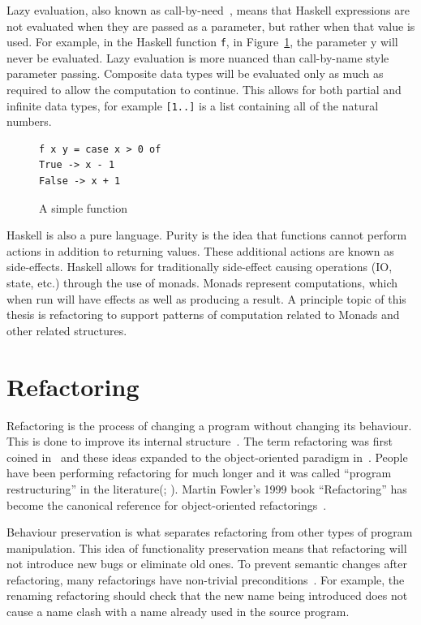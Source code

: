 Lazy evaluation, also known as call-by-need~\citep{wadsworth}, means that Haskell expressions are not evaluated when they are passed as a parameter, but rather when that value is used. For example, in the Haskell function \texttt{f}, in Figure~\ref{lazyY}, the parameter y will never be evaluated. Lazy evaluation is more nuanced than call-by-name style parameter passing. Composite data types will be evaluated only as much as required to allow the computation to continue. This allows for both partial and infinite data types, for example \texttt{[1..]} is a list containing all of the natural numbers. 

\begin{figure}[t]
\begin{lstlisting}
f x y = case x > 0 of
True -> x - 1
False -> x + 1
\end{lstlisting}
\caption{A simple function}
\label{lazyY}
\end{figure}

Haskell is also a pure language. Purity is the idea that functions cannot perform actions in addition to returning values. These additional actions are known as side-effects. Haskell allows for traditionally side-effect causing operations (IO, state, etc.) through the use of monads. Monads represent computations, which when run will have effects as well as producing a result. A principle topic of this thesis is refactoring to support patterns of computation related to Monads and other related structures. 

\section{Refactoring} 
Refactoring is the process of changing a program without changing its behaviour. This is done to improve its internal structure~\citep{fowler}. The term refactoring was first coined in~\citep{programRestructuring} and these ideas expanded to the object-oriented paradigm in~\citep{refactOOFrameworks}. People have been performing refactoring for much longer and it was called ``program restructuring'' in the literature(\cite{highSpeedRestructuring}; \cite{performanceRestructuring}). Martin Fowler's 1999 book ``Refactoring'' has become the canonical reference for object-oriented refactorings~\citep{fowler}.

Behaviour preservation is what separates refactoring from other types of program manipulation. This idea of functionality preservation means that refactoring will not introduce new bugs or eliminate old ones. To prevent semantic changes after refactoring, many refactorings have non-trivial preconditions~\citep{mens2002formalising}. For example, the renaming refactoring should check that the new name being introduced does not cause a name clash with a name already used in the source program.


